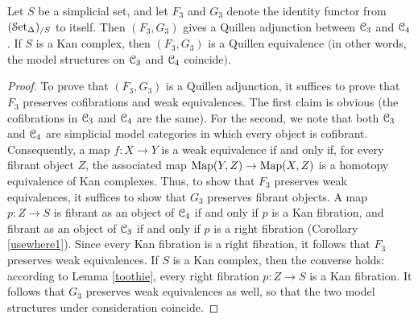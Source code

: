 \begin{proposition}\label{strstr}
Let $S$ be a simplicial set, and let $F_3$ and $G_3$ denote the identity functor
from $(\operatorname{\mathcal{S}et_{\Delta}})_{/S}$ to itself. Then $(F_3, G_3)$ gives a Quillen adjunction between
$\operatorname{\mathcal{C}}_3$ and $\operatorname{\mathcal{C}}_4$. If $S$ is a Kan complex, then $(F_3, G_3)$ is a Quillen equivalence 
$($in other words, the model structures on $\operatorname{\mathcal{C}}_3$ and $\operatorname{\mathcal{C}}_4$ coincide$)$.
\end{proposition}

\begin{proof}
To prove that $(F_3,G_3)$ is a Quillen adjunction, it suffices to prove that $F_3$ preserves cofibrations and weak equivalences. The first claim is obvious (the cofibrations in $\operatorname{\mathcal{C}}_3$ and $\operatorname{\mathcal{C}}_4$ are the same). For the second, we note that both $\operatorname{\mathcal{C}}_3$ and $\operatorname{\mathcal{C}}_4$ are simplicial model categories in which every object is cofibrant. Consequently, a map $f: X \rightarrow Y$
is a weak equivalence if and only if, for every fibrant object $Z$, the associated map
$\operatorname{{Map}}(Y,Z) \rightarrow \operatorname{{Map}}(X,Z)$ is a homotopy equivalence of Kan complexes.
Thus, to show that $F_3$ preserves weak equivalences, it suffices to show that
$G_3$ preserves fibrant objects. A map $p: Z \rightarrow S$ is fibrant as an object of 
$\operatorname{\mathcal{C}}_4$ if and only if $p$ is a Kan fibration, and fibrant as an object of $\operatorname{\mathcal{C}}_3$ if and only if $p$ is a right fibration (Corollary \ref{usewhere1}). Since every Kan fibration is a right fibration, it follows that $F_3$ preserves weak equivalences. If $S$ is a Kan complex, then the converse holds: according to Lemma \ref{toothie}, every right fibration $p: Z \rightarrow S$ is a Kan fibration. It follows that $G_3$ preserves weak equivalences as well, so that the two model structures under consideration coincide.
\end{proof}

